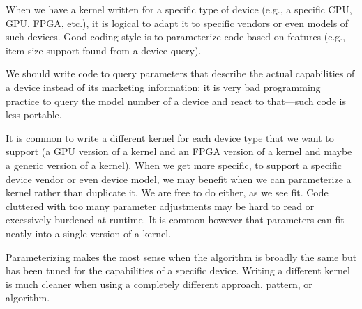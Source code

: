 When we have a kernel written for a specific type of device (e.g., a specific CPU, GPU, FPGA, etc.), it is logical to adapt it to specific vendors or even models of such devices. Good coding style is to parameterize code based on features (e.g., item size support found from a device query).\par

We should write code to query parameters that describe the actual capabilities of a device instead of its marketing information; it is very bad programming practice to query the model number of a device and react to that—such code is less portable.\par

It is common to write a different kernel for each device type that we want to support (a GPU version of a kernel and an FPGA version of a kernel and maybe a generic version of a kernel). When we get more specific, to support a specific device vendor or even device model, we may benefit when we can parameterize a kernel rather than duplicate it. We are free to do either, as we see fit. Code cluttered with too many parameter adjustments may be hard to read or excessively burdened at runtime. It is common however that parameters can fit neatly into a single version of a kernel.\par

\begin{tcolorbox}[colback=red!5!white,colframe=red!75!black]
Parameterizing makes the most sense when the algorithm is broadly the same but has been tuned for the capabilities of a specific device. Writing a different kernel is much cleaner when using a completely different approach, pattern, or algorithm.
\end{tcolorbox}



























































